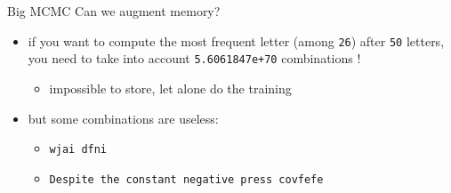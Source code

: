 \documentclass[
  ignorenonframetext,
]{beamer}
\providecommand{\tightlist}{%
  \setlength{\itemsep}{0pt}\setlength{\parskip}{0pt}}\usepackage{longtable,booktabs,array}
\begin{document}
\begin{frame}[fragile]{Big MCMC}
\label{big-mcmc}
Can we augment memory?

\begin{itemize}
\tightlist
\item
  if you want to compute the most frequent letter (among \texttt{26})
  after \texttt{50} letters, you need to take into account
  \texttt{5.6061847e+70} combinations !

  \begin{itemize}
  \tightlist
  \item
    impossible to store, let alone do the training
  \end{itemize}
\item
  but some combinations are useless:

  \begin{itemize}
  \tightlist
  \item
    \texttt{wjai\ dfni}
  \item
    \texttt{Despite\ the\ constant\ negative\ press\ covfefe} {🤔}
  \end{itemize}
\end{itemize}
\end{frame}
\end{document}
